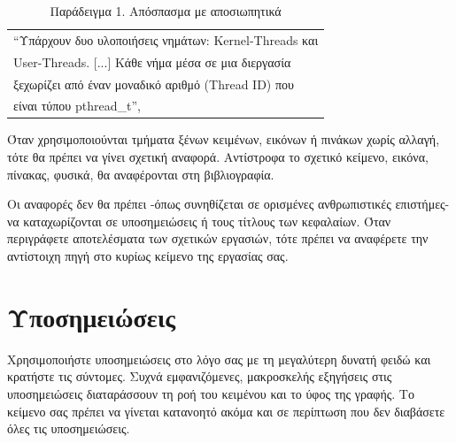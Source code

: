 \begin{table}
\begin{tabular}{|l|}\hline
``Υπάρχουν δυο υλοποιήσεις νημάτων: Kernel-Threads και\\
User-Threads. [...] Κάθε νήμα μέσα σε μια διεργασία \\
ξεχωρίζει από έναν μοναδικό αριθμό (Thread ID) που \\
είναι τύπου pthread\_t'', \cite{oslab-threads}\\
\hline
\end{tabular}
\caption{Παράδειγμα 1. Απόσπασμα με αποσιωπητικά}
\end{table}

Όταν χρησιμοποιούνται τμήματα ξένων κειμένων, εικόνων ή πινάκων χωρίς αλλαγή, τότε θα πρέπει να γίνει σχετική αναφορά. Αντίστροφα το σχετικό κείμενο, εικόνα, πίνακας, φυσικά, θα αναφέρονται στη βιβλιογραφία.

Οι αναφορές δεν θα πρέπει -όπως συνηθίζεται σε ορισμένες ανθρωπιστικές επιστήμες- να καταχωρίζονται σε υποσημειώσεις ή τους τίτλους των κεφαλαίων. Όταν περιγράφετε αποτελέσματα των σχετικών εργασιών, τότε πρέπει να αναφέρετε την αντίστοιχη πηγή στο κυρίως κείμενο της εργασίας σας.

\section{Υποσημειώσεις}
Χρησιμοποιήστε υποσημειώσεις στο λόγο σας με τη μεγαλύτερη δυνατή φειδώ και κρατήστε τις σύντομες.
Συχνά εμφανιζόμενες, μακροσκελής εξηγήσεις στις υποσημειώσεις διαταράσσουν τη ροή του κειμένου και το ύφος της γραφής. Το κείμενο σας πρέπει να γίνεται κατανοητό ακόμα και σε περίπτωση που δεν διαβάσετε όλες τις υποσημειώσεις.

